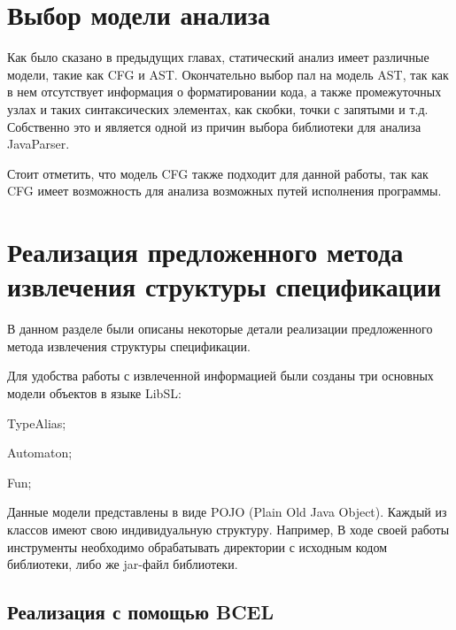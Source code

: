 \section{Выбор модели анализа}

Как было сказано в предыдущих главах, статический анализ имеет различные модели, такие как CFG и AST.
Окончательно выбор пал на модель AST, так как в нем отсутствует информация о форматировании кода, а также промежуточных узлах и таких синтаксических элементах, как скобки, точки с запятыми и т.д.
Собственно это и является одной из причин выбора библиотеки для анализа JavaParser.

Стоит отметить, что модель CFG также подходит для данной работы, так как CFG имеет возможность для анализа возможных путей исполнения программы.

\section{Реализация предложенного метода извлечения структуры спецификации}

В данном разделе были описаны некоторые детали реализации предложенного метода извлечения структуры спецификации.

Для удобства работы с извлеченной информацией были созданы три основных модели объектов в языке LibSL:
%
\begin{itemize*}
\item TypeAlias;
\item Automaton;
\item Fun;
\end{itemize*}
%

Данные модели представлены в виде POJO (Plain Old Java Object). Каждый из классов имеют свою индивидуальную структуру. Например,
В ходе своей работы инструменты необходимо обрабатывать директории с исходным кодом библиотеки, либо же jar-файл библиотеки.

\subsection{Реализация с помощью BCEL}

